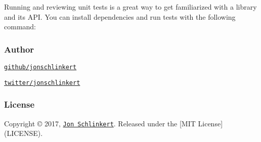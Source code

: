 {\ttfamily }

{\ttfamily Running and reviewing unit tests is a great way to get familiarized with a library and its A\+PI. You can install dependencies and run tests with the following command\+:}

{\ttfamily 
{}
}

{\ttfamily \subsubsection*{Author}}

{\ttfamily }

{}

{\ttfamily 
\begin{DoxyItemize}
\item \href{https://github.com/jonschlinkert}{\tt github/jonschlinkert}
\item \href{https://twitter.com/jonschlinkert}{\tt twitter/jonschlinkert}
\end{DoxyItemize}}

{\ttfamily \subsubsection*{License}}

{\ttfamily }

{\ttfamily Copyright © 2017, \href{https://github.com/jonschlinkert}{\tt Jon Schlinkert}. Released under the \mbox{[}M\+IT License\mbox{]}(L\+I\+C\+E\+N\+SE).}

{\ttfamily 

}

{ }
